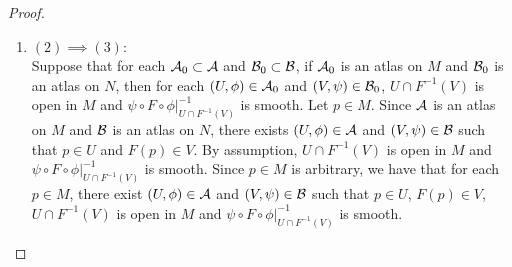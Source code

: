 \documentclass{book}
\begin{document}
\begin{proof}
\begin{enumerate}
\begin{itemize}
			\item since $\al^{-1}$ is smooth,  implies that $ \al|_{\phi_1(U)}^{-1}$ is smooth,
			\item since $F_0|_{\phi_0(U)} = \be \circ F_1 \circ \al|_{\phi_1(U)}^{-1}$,  implies that that $F_0|_{\phi_0(U)}$ is smooth.
		\end{itemize}
		Therfore we have the following:
		\begin{itemize}
			\item Since $a \in \phi_0(U_0 \cap F^{-1}(V_0))$ is arbitrary, we have that for each $a \in \phi_0(U_0 \cap F^{-1}(V_0))$, there exists $A \in \MT_{\H^m} \cap \phi_0(U_0 \cap F^{-1}(V_0))$ such that $a \in A$, and $F_0|_A$ is smooth.  implies that $F_0$ is smooth. 
			\item Since $(U_0, \phi_0) \in \MA_0$ and $(V_0, \psi_0) \in \MB_0$ are arbitrary, we have that for each $(U, \phi) \in \MA_0$ and $(V, \psi) \in \MB_0$, $\psi \circ F \circ \phi|_{U \cap F^{-1}(V)}^{-1}$ is smooth. 
			\item Since $\MA_0 \subset \MA$ and $\MB_0 \subset \MB$ such that $\MA_0$ is an atlas on $M$ and $\MB_0$ is an atlas on $N$ are arbitrary, we have that for each $\MA_0 \subset \MA$ and $\MB_0 \subset \MB$, if $\MA_0$ is an atlas on $M$ and $\MB_0$ is an atlas on $N$, then for each $(U, \phi) \in \MA_0$ and $(V, \psi) \in \MB_0$, $U \cap F^{-1}(V)$ is open in $M$ and $\psi \circ F \circ \phi|_{U \cap F^{-1}(V)}^{-1}$ is smooth.
		\end{itemize}
		\item $(2) \implies (3)$: \\
		Suppose that for each $\MA_0 \subset \MA$ and $\MB_0 \subset \MB$, if $\MA_0$ is an atlas on $M$ and $\MB_0$ is an atlas on $N$, then for each $(U, \phi) \in \MA_0$ and $(V, \psi) \in \MB_0$, $U \cap F^{-1}(V)$ is open in $M$ and $\psi \circ F \circ \phi|_{U \cap F^{-1}(V)}^{-1}$ is smooth. Let $p \in M$. Since $\mathcal{A}$ is an atlas on $M$ and $\mathcal{B}$ is an atlas on $N$, there exists $(U, \phi) \in \mathcal{A}$ and $(V, \psi) \in \mathcal{B}$ such that $p \in U$ and $F(p) \in V$. By assumption, $U \cap F^{-1}(V)$ is open in $M$ and $\psi \circ F \circ \phi|_{U \cap F^{-1}(V)}^{-1}$ is smooth. Since $p \in M$ is arbitrary, we have that for each $p \in M$, there exist $(U, \phi) \in \mathcal{A}$ and $(V, \psi) \in \mathcal{B}$ such that $p \in U$, $F(p) \in V$, $U \cap F^{-1}(V)$ is open in $M$ and $\psi \circ F \circ \phi|_{U \cap F^{-1}(V)}^{-1}$ is smooth. 

\end{enumerate}
\end{proof}
\end{document}

